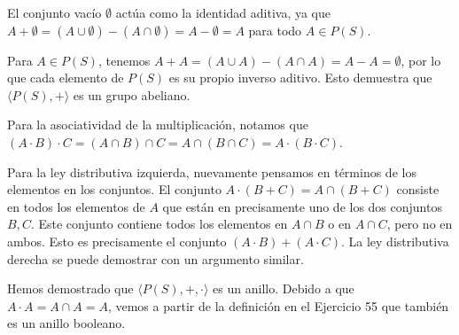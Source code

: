 \begin{enumerate}
\begin{enumerate}
		El conjunto vacío $\emptyset$ actúa como la identidad aditiva, ya que $A + \emptyset = (A \cup \emptyset) - (A \cap \emptyset) = A - \emptyset = A$ para todo $A \in P(S)$.
		
		Para $A \in P(S)$, tenemos $A + A = (A \cup A) - (A \cap A) = A - A = \emptyset$, por lo que cada elemento de $P(S)$ es su propio inverso aditivo. Esto demuestra que $\langle P(S), + \rangle$ es un grupo abeliano.
		
		Para la asociatividad de la multiplicación, notamos que $(A \cdot B) \cdot C = (A \cap B) \cap C = A \cap (B \cap C) = A \cdot (B \cdot C)$.
		
		Para la ley distributiva izquierda, nuevamente pensamos en términos de los elementos en los conjuntos. El conjunto $A \cdot (B + C) = A \cap (B + C)$ consiste en todos los elementos de $A$ que están en precisamente uno de los dos conjuntos $B, C$. Este conjunto contiene todos los elementos en $A \cap B$ o en $A \cap C$, pero no en ambos. Esto es precisamente el conjunto $(A \cdot B) + (A \cdot C)$. La ley distributiva derecha se puede demostrar con un argumento similar.
		
		Hemos demostrado que $\langle P(S), +, \cdot \rangle$ es un anillo. Debido a que $A \cdot A = A \cap A = A$, vemos a partir de la definición en el Ejercicio 55 que también es un anillo booleano.
	\end{enumerate}

	
	
\end{enumerate}